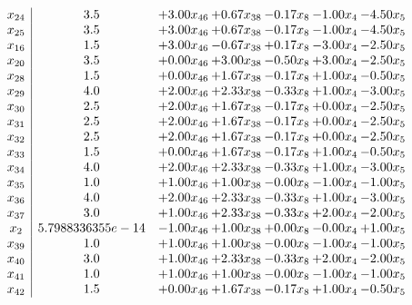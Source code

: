\documentclass[8pt]{article}
\begin{document}
\[\begin{array}{c| c c@{\hskip 2pt} c@{\hskip 2pt} c@{\hskip 2pt} c@{\hskip 2pt} c@{\hskip 2pt} }
 x_{24}   &  3.5 & +  3.00 x_{46} & +  0.67 x_{38} & -0.17 x_{8} & -1.00 x_{4} & -4.50 x_{5}\\
 x_{25}   &  3.5 & +  3.00 x_{46} & +  0.67 x_{38} & -0.17 x_{8} & -1.00 x_{4} & -4.50 x_{5}\\
 x_{16}   &  1.5 & +  3.00 x_{46} & -0.67 x_{38} & +  0.17 x_{8} & -3.00 x_{4} & -2.50 x_{5}\\
 x_{20}   &  3.5 & +  0.00 x_{46} & +  3.00 x_{38} & -0.50 x_{8} & +  3.00 x_{4} & -2.50 x_{5}\\
 x_{28}   &  1.5 & +  0.00 x_{46} & +  1.67 x_{38} & -0.17 x_{8} & +  1.00 x_{4} & -0.50 x_{5}\\
 x_{29}   &  4.0 & +  2.00 x_{46} & +  2.33 x_{38} & -0.33 x_{8} & +  1.00 x_{4} & -3.00 x_{5}\\
 x_{30}   &  2.5 & +  2.00 x_{46} & +  1.67 x_{38} & -0.17 x_{8} & +  0.00 x_{4} & -2.50 x_{5}\\
 x_{31}   &  2.5 & +  2.00 x_{46} & +  1.67 x_{38} & -0.17 x_{8} & +  0.00 x_{4} & -2.50 x_{5}\\
 x_{32}   &  2.5 & +  2.00 x_{46} & +  1.67 x_{38} & -0.17 x_{8} & +  0.00 x_{4} & -2.50 x_{5}\\
 x_{33}   &  1.5 & +  0.00 x_{46} & +  1.67 x_{38} & -0.17 x_{8} & +  1.00 x_{4} & -0.50 x_{5}\\
 x_{34}   &  4.0 & +  2.00 x_{46} & +  2.33 x_{38} & -0.33 x_{8} & +  1.00 x_{4} & -3.00 x_{5}\\
 x_{35}   &  1.0 & +  1.00 x_{46} & +  1.00 x_{38} & -0.00 x_{8} & -1.00 x_{4} & -1.00 x_{5}\\
 x_{36}   &  4.0 & +  2.00 x_{46} & +  2.33 x_{38} & -0.33 x_{8} & +  1.00 x_{4} & -3.00 x_{5}\\
 x_{37}   &  3.0 & +  1.00 x_{46} & +  2.33 x_{38} & -0.33 x_{8} & +  2.00 x_{4} & -2.00 x_{5}\\
 x_{2}   &  5.7988336355e-14 & -1.00 x_{46} & +  1.00 x_{38} & +  0.00 x_{8} & -0.00 x_{4} & +  1.00 x_{5}\\
 x_{39}   &  1.0 & +  1.00 x_{46} & +  1.00 x_{38} & -0.00 x_{8} & -1.00 x_{4} & -1.00 x_{5}\\
 x_{40}   &  3.0 & +  1.00 x_{46} & +  2.33 x_{38} & -0.33 x_{8} & +  2.00 x_{4} & -2.00 x_{5}\\
 x_{41}   &  1.0 & +  1.00 x_{46} & +  1.00 x_{38} & -0.00 x_{8} & -1.00 x_{4} & -1.00 x_{5}\\
 x_{42}   &  1.5 & +  0.00 x_{46} & +  1.67 x_{38} & -0.17 x_{8} & +  1.00 x_{4} & -0.50 x_{5}\\

\end{array}\]
\end{document}
